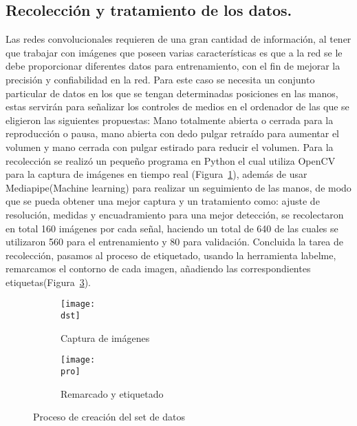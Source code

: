 \documentclass[a4paper, 12pt]{article}
\newcommand{\dst}{img/create_dst.png}
\newcommand{\pro}{img/label_procss.png}
\begin{document}
    \subsection{Recolección y tratamiento de los datos.} 
    Las redes convolucionales requieren de una gran cantidad de información, al tener que trabajar con imágenes que poseen varias características es que a la red se le debe proporcionar diferentes datos para entrenamiento, con el fin de mejorar la precisión y confiabilidad en la red. Para este caso se necesita un conjunto particular de datos en los que se tengan determinadas posiciones en las manos, estas servirán para señalizar los controles de medios en el ordenador de las que se eligieron las siguientes propuestas: Mano totalmente abierta o cerrada para la reproducción o pausa, mano abierta con dedo pulgar retraído para aumentar el volumen y mano cerrada con pulgar estirado para reducir el volumen. Para la recolección se realizó un pequeño programa en Python el cual utiliza OpenCV para la captura de imágenes en tiempo real (Figura~\ref{sub:create_dataset}), además de usar Mediapipe(Machine learning) para realizar un seguimiento de las manos, de modo que se pueda obtener una mejor captura y un tratamiento como: ajuste de resolución, medidas y encuadramiento para una mejor detección, se recolectaron en total 160 imágenes por cada señal, haciendo un total de 640 de las cuales se utilizaron 560 para el entrenamiento y 80 para validación. Concluida la tarea de recolección, pasamos al proceso de etiquetado, usando la herramienta labelme, remarcamos el contorno de cada imagen, añadiendo las correspondientes etiquetas(Figura~\ref{sub:label_prcss}). 

    \begin{figure}[H] 
        \centering 

        \begin{subfigure}{0.8\linewidth} 
            \texttt{[image: \\dst]} 
            \caption{Captura de imágenes} 
            \label{sub:create_dataset} 
        \end{subfigure} 

        \begin{subfigure}{0.8\textwidth} 
            \texttt{[image: \\pro]} 
            \caption{Remarcado y etiquetado} 
            \label{sub:label_prcss} 
        \end{subfigure} 

        \caption{Proceso de creación del set de datos} 
    \end{figure} 
\end{document}
